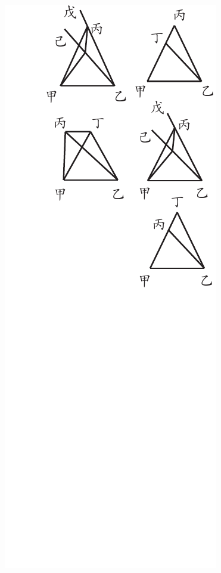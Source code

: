 \documentclass[12pt,b5paper,landscape]{article}
\begin{document}
\begin{multicols}{2}
\begin{center}
\includegraphics[angle=90]{eu43}
\end{center}

\end{multicols}
\end{document}

